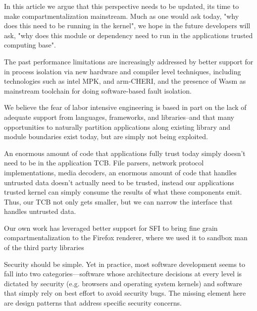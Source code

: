 In this article we argue that this perspective needs to be updated, its time
to make compartmentalization mainstream. Much as one would ask today, "why
does this need to be running in the kernel", we hope in the future developers
will ask, "why does this module or dependency need to run in the applications
trusted computing base".

The past performance limitations are increasingly addressed by better
support for in process isolation via new hardware and compiler
level techniques, including technologies such as intel MPK, and
arm-CHERI, and the presence of Wasm as mainstream toolchain for
doing software-based fault isolation.

We believe the fear of labor intensive engineering is based in part on the
lack of adequate support from languages, frameworks, and libraries--and
that many opportunities to naturally partition applications along existing
library and module boundaries exist today, but are simply not being exploited.

An enormous amount of code that applications fully trust today simply doesn't
need to be in the application TCB. File parsers, network protocol implementations,
media decoders, an enormous amount of code that handles untrusted data doesn't
actually need to be trusted, instead our applications trusted kernel can simply
consume the results of what these components emit. Thus, our TCB not only
gets smaller, but we can narrow the interface that handles untrusted data.

Our own work has leveraged better support for SFI to bring fine grain
compartmentalization to the Firefox renderer, where we used it to sandbox man
of the third party libraries 





Security should be simple. Yet in practice, most software development seems to 
fall into two categories---software whose architecture decisions at every level 
is dictated by security (e.g. browsers and operating system kernels) and 
software that simply rely on best effort to avoid security bugs.
%
The missing element here are design patterns that address specific security 
concerns. 

